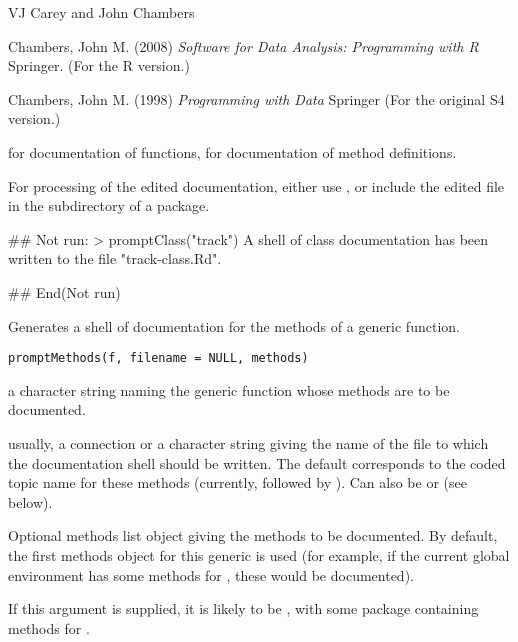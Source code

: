 %
\begin{Author}\relax
VJ Carey  and John Chambers
\end{Author}
%
\begin{References}\relax
Chambers, John M. (2008)
\emph{Software for Data Analysis: Programming with R}
Springer.  (For the R version.)

Chambers, John M. (1998)
\emph{Programming with Data}
Springer (For the original S4 version.) 
\end{References}
%
\begin{SeeAlso}\relax
{} for documentation of functions,
 for documentation of method definitions.

For processing of the edited documentation, either use
,
or include the edited file in the  subdirectory of a
package.
\end{SeeAlso}
%
\begin{Examples}
\begin{ExampleCode}

## Not run: > promptClass("track")
A shell of class documentation has been written to the
file "track-class.Rd".

## End(Not run)
\end{ExampleCode}
\end{Examples}
%
\begin{Description}\relax
Generates a shell of documentation for the methods of a generic
function.
\end{Description}
%
\begin{Usage}
\begin{verbatim}
promptMethods(f, filename = NULL, methods)
\end{verbatim}
\end{Usage}
%
\begin{Arguments}
\begin{ldescription}
\item[\code{f}] a character string naming the generic function whose methods
are to be documented.
\item[\code{filename}] usually, a connection or a character string giving the
name of the file to which the documentation shell should be written.
The default corresponds to the coded topic name for these methods
(currently,  followed by ).  Can also be
 or  (see below).
\item[\code{methods}] Optional methods list object giving the methods to be
documented.  By default, the first methods object for this generic
is used (for example, if the current global environment has some
methods for , these would be documented).

If this argument is supplied, it is likely to be
, with  some package
containing methods for .
\end{ldescription}
\end{Arguments}
